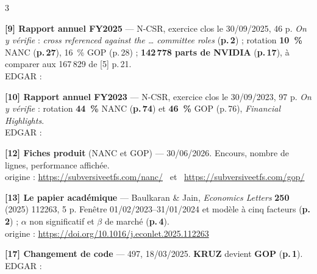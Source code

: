 \documentclass[9pt,a4paper]{extarticle}
\begin{document}
\begin{multicols}{3}
{\vspace{0.35mm}
\textbf{[9] Rapport annuel FY2025} --- N-CSR, exercice clos le 30/09/2025, 46 p. \emph{On y vérifie} : \og{}\emph{cross referenced against the \ldots{} committee roles}\fg{} (\textbf{p.\,2}) ; rotation \textbf{10~\%} NANC (\textbf{p.\,27}), 16~\% GOP (p.\,28) ; \textbf{142\,778 parts de NVIDIA} (\textbf{p.\,17}), à comparer aux 167\,829 de [5] p.\,21.\\
{\color{grisf}EDGAR :} 

\vspace{0.35mm}
\textbf{[10] Rapport annuel FY2023} --- N-CSR, exercice clos le 30/09/2023, 97 p. \emph{On y vérifie} : rotation \textbf{44~\%} NANC (\textbf{p.\,74}) et \textbf{46~\%} GOP (p.\,76), \emph{Financial Highlights}.\\
{\color{grisf}EDGAR :} 

\vspace{0.35mm}
\textbf{[12] Fiches produit} (NANC et GOP) --- 30/06/2026. Encours, nombre de lignes, performance affichée.\\
{\color{grisf}origine :} \url{https://subversiveetfs.com/nanc/} \ et \ \url{https://subversiveetfs.com/gop/}
\par}

\vspace{0.35mm}
\textbf{[13] Le papier académique} --- Baulkaran \& Jain, \emph{Economics Letters} \textbf{250} (2025) 112263, 5 p. Fenêtre 01/02/2023--31/01/2024 et modèle à cinq facteurs (\textbf{p.\,2}) ; $\alpha$ non significatif et $\beta$ de marché (\textbf{p.\,4}).\\
{\color{grisf}origine :} \url{https://doi.org/10.1016/j.econlet.2025.112263}

\vspace{0.35mm}
\textbf{[17] Changement de code} --- 497, 18/03/2025. \textbf{KRUZ} devient \textbf{GOP} (\textbf{p.\,1}).\\
{\color{grisf}EDGAR :} 

\vspace{1mm}
\end{multicols}
\end{document}
